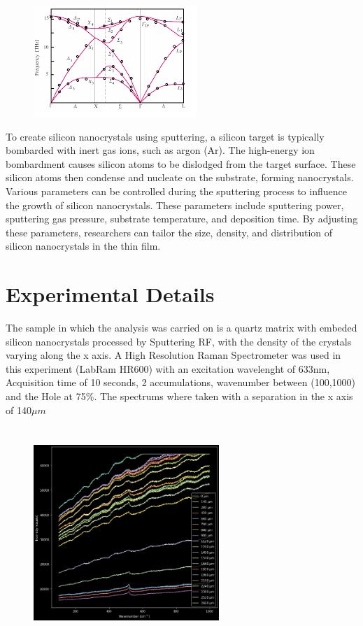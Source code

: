 \documentclass[a4paper,10pt,twocolumn]{article}
\begin{document}
\begin{figure}
  \centering
  \includegraphics[scale=0.9]{relacionesdedispersiondefonones.png}
\end{figure}

To create silicon nanocrystals using sputtering, a silicon target is typically bombarded with inert gas ions, such as argon (Ar). The high-energy ion bombardment causes silicon atoms to be dislodged from the target surface. These silicon atoms then condense and nucleate on the substrate, forming nanocrystals. Various parameters can be controlled during the sputtering process to influence the growth of silicon nanocrystals. These parameters include sputtering power, sputtering gas pressure, substrate temperature, and deposition time. By adjusting these parameters, researchers can tailor the size, density, and distribution of silicon nanocrystals in the thin film.


\section{Experimental Details}
The sample in which the analysis was carried on is a quartz matrix with embeded silicon nanocrystals processed by Sputtering RF, with the density of the crystals varying along the x axis. A High Resolution Raman Spectrometer was used in this experiment (LabRam HR600) with an excitation wavelenght
of 633nm, Acquisition time of 10 seconds, 2 accumulations, wavenumber between (100,1000) and the Hole at 75\%. The spectrums where taken with a separation in the x axis of 140$\mu m$

\begin{figure}[h]
  \centering
  \includegraphics[height=8cm, width=7cm]{all_n.png}
\end{figure}
\end{document}

